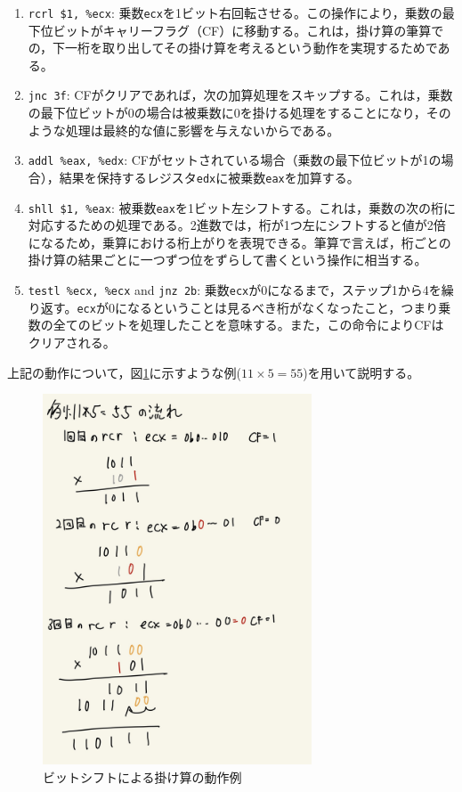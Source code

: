 \documentclass[a4paper]{jsarticle}
\newcommand{\var}[1]{\texttt{#1}}
\begin{document}
\begin{enumerate}
    \item \var{rcrl \$1, \%ecx}: 乗数\var{ecx}を1ビット右回転させる。この操作により，乗数の最下位ビットがキャリーフラグ（CF）に移動する。これは，掛け算の筆算での，下一桁を取り出してその掛け算を考えるという動作を実現するためである。
    \item \var{jnc 3f}: CFがクリアであれば，次の加算処理をスキップする。これは，乗数の最下位ビットが0の場合は被乗数に0を掛ける処理をすることになり，そのような処理は最終的な値に影響を与えないからである。
    \item \var{addl \%eax, \%edx}: CFがセットされている場合（乗数の最下位ビットが1の場合），結果を保持するレジスタ\var{edx}に被乗数\var{eax}を加算する。
    \item \var{shll \$1, \%eax}: 被乗数\var{eax}を1ビット左シフトする。これは，乗数の次の桁に対応するための処理である。2進数では，桁が1つ左にシフトすると値が2倍になるため，乗算における桁上がりを表現できる。筆算で言えば，桁ごとの掛け算の結果ごとに一つずつ位をずらして書くという操作に相当する。
    \item \var{testl \%ecx, \%ecx} and \var{jnz 2b}: 乗数\var{ecx}が0になるまで，ステップ1から4を繰り返す。\var{ecx}が0になるということは見るべき桁がなくなったこと，つまり乗数の全てのビットを処理したことを意味する。また，この命令によりCFはクリアされる。
\end{enumerate}


上記の動作について，図\ref{fig:mul_example}に示すような例($11 \times 5 = 55$)を用いて説明する。


\begin{figure}[h]
    \centering
    \includegraphics[width=8cm]{./img-mul.jpg}
    \caption{ビットシフトによる掛け算の動作例}
    \label{fig:mul_example}
\end{figure}
\end{document}

